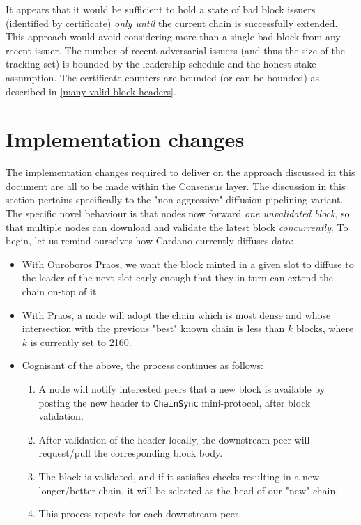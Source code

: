 \documentclass[11pt,a4paper]{article}
\begin{document}
It appears that it would be sufficient to hold a state of bad block issuers
(identified by certificate) \emph{only until} the current chain is successfully
extended. This approach would avoid considering more than a single bad block from any
recent issuer. The number of recent adversarial issuers (and thus the size of
the tracking set) is bounded by the leadership schedule and the honest stake
assumption. The certificate counters are bounded (or can be bounded) as
described in \cref{many-valid-block-headers}.

\pagebreak

\section{Implementation changes}
The implementation changes required to deliver on the approach discussed in this document
are all to be made within the Consensus layer. The discussion in this section pertains specifically 
to the "non-aggressive" diffusion pipelining variant. The specific novel behaviour is that nodes now
forward \emph{one unvalidated block}, so that multiple nodes can download and validate the latest 
block \emph{concurrently}. To begin, let us remind ourselves how Cardano currently diffuses data:

\begin{itemize}
  \item With Ouroboros Praos, we want the block minted in a given slot to diffuse to the leader of the next slot early enough that they in-turn can extend the chain on-top of it.
  \item With Praos, a node will adopt the chain which is most dense and whose intersection with the previous "best" known chain is less than $k$ blocks, where $k$ is currently set to 2160.
  \item Cognisant of the above, the process continues as follows:
  \begin{enumerate}
    \item A node will notify interested peers that a new block is available by posting the new header to \lstinline{ChainSync} mini-protocol, after block validation. 
    \item After validation of the header locally, the downstream peer will request/pull the corresponding block body.
    \item The block is validated, and if it satisfies checks resulting in a new longer/better chain, it will be selected as the head of our "new" chain.
    \item This process repeats for each downstream peer.
  \end{enumerate}
\end{itemize}
\end{document}
